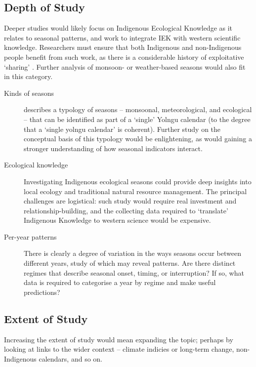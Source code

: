 \subsection{Depth of Study}
Deeper studies would likely focus on Indigenous Ecological Knowledge as it
relates to seasonal patterns, and work to integrate IEK with western scientific
knowledge.  Researchers must ensure that both Indigenous and non-Indigenous
people benefit from such work, as there is a considerable history of
exploitative `sharing' \citep[eg.][]{smith1999}.  Further analysis of monsoon-
or weather-based seasons would also fit in this category.

\begin{description}
\item[Kinds of seasons]
     describes a typology of seasons -- monsoonal,
    meteorological, and ecological -- that can be identified as part of a
    `single' Yolngu calendar (to the degree that a `single yolngu calendar'
    is coherent).  Further study on the conceptual basis of this typology would
    be enlightening, as would gaining a stronger understanding of how
    seasonal indicators interact.

\item[Ecological knowledge]
    Investigating Indigenous ecological seasons could provide deep insights
    into local ecology and traditional natural resource management. The
    principal challenges are logistical:  such study would require real
    investment and relationship-building, and the collecting data
    required to `translate' Indigenous Knowledge to western science would
    be expensive.

\item[Per-year patterns]
    There is clearly a degree of variation in the ways seasons occur between
    different years, study of which may reveal patterns.  Are there distinct
    regimes that describe seasonal onset, timing, or interruption?  If so, what
    data is required to categorise a year by regime and make useful predictions?
\end{description}

\subsection{Extent of Study}
Increasing the extent of study would mean expanding the topic; perhaps by
looking at links to the wider context -- climate indicies or long-term
change, non-Indigenous calendars, and so on.

